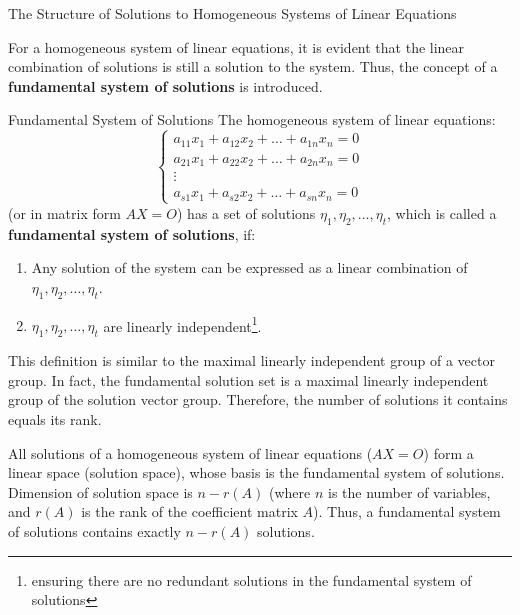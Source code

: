 \documentclass[11pt]{../../TexTemplate/elegantbook} %
\begin{document}
\begin{leftbarTitle}{The Structure of Solutions to Homogeneous Systems of Linear Equations}\end{leftbarTitle}
For a homogeneous system of linear equations, 
it is evident that the linear combination of solutions is still a solution to the system. 
Thus, the concept of a \textbf{fundamental system of solutions} is introduced.

\begin{definition}{Fundamental System of Solutions}
    The homogeneous system of linear equations:
    \[
    \begin{cases}
    a_{11}x_{1} + a_{12}x_{2} + \dots + a_{1n}x_{n} = 0 \\
    a_{21}x_{1} + a_{22}x_{2} + \dots + a_{2n}x_{n} = 0 \\
    \vdots \\
    a_{s1}x_{1} + a_{s2}x_{2} + \dots + a_{sn}x_{n} = 0
    \end{cases}
    \]
    (or in matrix form \( AX = O \))
    has a set of solutions \( \eta_{1}, \eta_{2}, \dots, \eta_{t} \), which is called a \textbf{fundamental system of solutions}, 
    if:
    \begin{enumerate}
        \item Any solution of the system can be expressed as a linear combination of \( \eta_{1}, \eta_{2}, \dots, \eta_{t} \).
        \item \( \eta_{1}, \eta_{2}, \dots, \eta_{t} \) are linearly independent\footnote{
            ensuring there are no redundant solutions in the fundamental system of solutions
        }.
    \end{enumerate}
\end{definition}

\begin{remark}
    This definition is similar to the maximal linearly independent group of a vector group. 
    In fact, the fundamental solution set is a maximal linearly independent group of the solution vector group. 
    Therefore, the number of solutions it contains equals its rank.
\end{remark}


\vspace{0.7cm}
All solutions of a homogeneous system of linear equations (\( AX = O \)) form a linear space (solution space),
whose basis is the fundamental system of solutions.
Dimension of solution space is \( n - r(A) \) (where \( n \) is the number of variables, 
and \( r(A) \) is the rank of the coefficient matrix \( A \)). 
Thus, a fundamental system of solutions contains exactly \( n - r(A) \) solutions.
    
\end{document}
